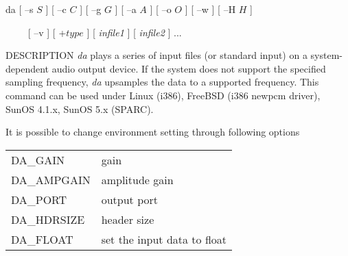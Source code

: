 %
\hypertarget{da}{}
\begin{synopsis}
\item [da] [ --s $S$ ] [ --c $C$ ] [ --g $G$ ] [ --a $A$ ] [ --o $O$ ] 
	   [ --w ] [ --H $H$ ]
\item [\ ~~~] [ --v ] [ +$type$ ] [ {\em infile1} ] [ {\em infile2} ] ...
\end{synopsis}

\begin{qsection}{DESCRIPTION}
{\em da} plays a series of input files (or standard input) 
on a system-dependent audio output device.
If the system does not support the specified sampling frequency, 
{\em da} upsamples the data to a supported frequency.
This command can be used under
Linux (i386), FreeBSD (i386 newpcm driver), SunOS 4.1.x, SunOS 5.x (SPARC).
 
It is possible to change environment setting through following options

\begin{tabular}{ll}
DA\_GAIN & gain\\
DA\_AMPGAIN & amplitude gain\\
DA\_PORT & output port\\
DA\_HDRSIZE & header size\\
DA\_FLOAT & set the input data to float\\
\end{tabular}

\end{qsection}

\begin{options}
\end{options}

